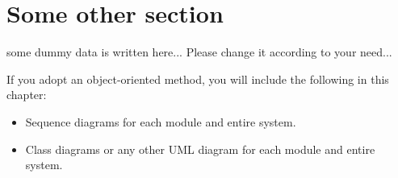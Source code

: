 \section{Some other section}
some dummy data is written here... Please change it according to your need...\cite{lecun2015deep,vaswani2017attention}

If you adopt an object-oriented method, you will include the following in this chapter:

\begin{itemize}
	\item Sequence diagrams for each module and entire system.
	\item Class diagrams or any other UML diagram for each module and entire system.
\end{itemize}